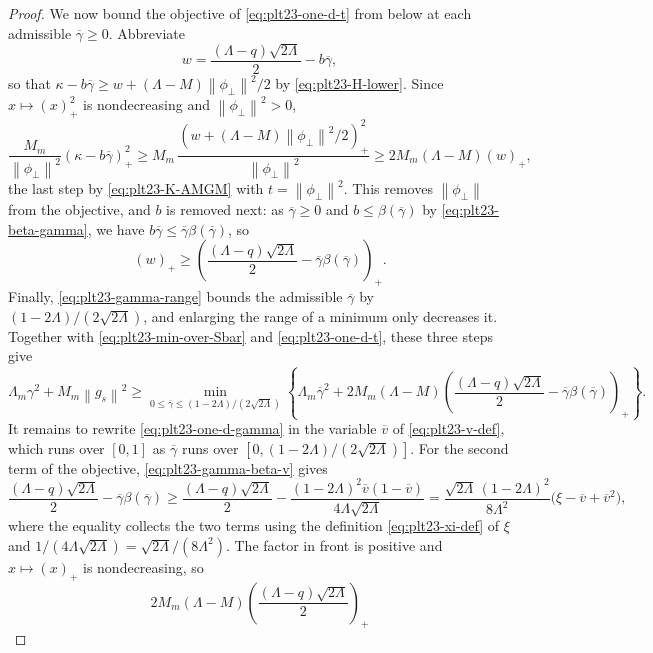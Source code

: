 \documentclass[11pt]{article}
\numberwithin{equation}{section}
\newcommand{\norm}[1]{\left\lVert #1\right\rVert}
\newcommand{\pos}[1]{\left(#1\right)_{+}}
\begin{document}
\begin{proof}
  We now bound the objective of \eqref{eq:plt23-one-d-t} from below at each
  admissible $\overline\gamma\ge0$.  Abbreviate
  \[
    w=\frac{(\Lambda-q)\sqrt{2\Lambda}}{2}-b\overline\gamma,
  \]
  so that $\kappa-b\overline\gamma\ge w+(\Lambda-M)\norm{\phi_\perp}^2/2$ by
  \eqref{eq:plt23-H-lower}.  Since $x\mapsto\pos x^2$ is nondecreasing and
  $\norm{\phi_\perp}^2>0$,
  \[
    \frac{M_m}{\norm{\phi_\perp}^2}\pos{\kappa-b\overline\gamma}^2
    \ge M_m\,
    \frac{\pos{w+(\Lambda-M)\norm{\phi_\perp}^2/2}^2}{\norm{\phi_\perp}^2}
    \ge2M_m(\Lambda-M)\pos w,
  \]
  the last step by \eqref{eq:plt23-K-AMGM} with $t=\norm{\phi_\perp}^2$.  This
  removes $\norm{\phi_\perp}$ from the objective, and $b$ is removed next:
  as $\overline\gamma\ge0$ and $b\le\beta(\overline\gamma)$ by
  \eqref{eq:plt23-beta-gamma}, we have
  $b\overline\gamma\le\overline\gamma\beta(\overline\gamma)$, so
  \[
    \pos w\ge
    \pos{\frac{(\Lambda-q)\sqrt{2\Lambda}}{2}
    -\overline\gamma\beta(\overline\gamma)}.
  \]
  Finally, \eqref{eq:plt23-gamma-range} bounds the admissible
  $\overline\gamma$ by $(1-2\Lambda)/(2\sqrt{2\Lambda})$, and enlarging the
  range of a minimum only decreases it.  Together with
  \eqref{eq:plt23-min-over-Sbar} and \eqref{eq:plt23-one-d-t}, these three
  steps give
  \begin{equation}\label{eq:plt23-one-d-gamma}
    \Lambda_m\gamma^2+M_m\norm{g_s}^2
    \ge
    \min_{0\le\overline\gamma\le(1-2\Lambda)/(2\sqrt{2\Lambda})}
    \left\{
    \Lambda_m\overline\gamma^2+2M_m(\Lambda-M)
    \pos{\frac{(\Lambda-q)\sqrt{2\Lambda}}{2}
    -\overline\gamma\beta(\overline\gamma)}
    \right\}.
  \end{equation}
  It remains to rewrite \eqref{eq:plt23-one-d-gamma} in the variable
  $\overline v$ of \eqref{eq:plt23-v-def}, which runs over $[0,1]$ as
  $\overline\gamma$ runs over $[0,(1-2\Lambda)/(2\sqrt{2\Lambda})]$.  For the
  second term of the objective, \eqref{eq:plt23-gamma-beta-v} gives
  \[
    \frac{(\Lambda-q)\sqrt{2\Lambda}}{2}
    -\overline\gamma\beta(\overline\gamma)
    \ge\frac{(\Lambda-q)\sqrt{2\Lambda}}{2}
    -\frac{(1-2\Lambda)^2\overline v(1-\overline v)}{4\Lambda\sqrt{2\Lambda}}
    =\frac{\sqrt{2\Lambda}\,(1-2\Lambda)^2}{8\Lambda^2}
    \bigl(\xi-\overline v+\overline v^2\bigr),
  \]
  where the equality collects the two terms using the definition
  \eqref{eq:plt23-xi-def} of $\xi$ and
  $1/(4\Lambda\sqrt{2\Lambda})=\sqrt{2\Lambda}/(8\Lambda^2)$.  The factor in
  front is positive and $x\mapsto\pos x$ is nondecreasing, so
  \[
    2M_m(\Lambda-M)
    \pos{\frac{(\Lambda-q)\sqrt{2\Lambda}}{2}
}\]
\end{proof}
\end{document}
